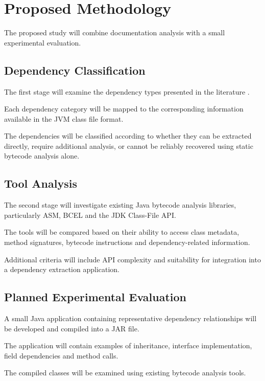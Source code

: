 \documentclass[conference]{IEEEtran}
\begin{document}
	
	\section{Proposed Methodology}
	
	The proposed study will combine
	documentation analysis with a small
	experimental evaluation.
	
	\subsection{Dependency Classification}
	
	The first stage will examine the
	dependency types presented in
	the literature \cite{b1}.
	
	Each dependency category will be
	mapped to the corresponding information
	available in the JVM class file format.
	
	The dependencies will be classified
	according to whether they can be
	extracted directly, require additional
	analysis, or cannot be reliably recovered
	using static bytecode analysis alone.
	
	\subsection{Tool Analysis}
	
	The second stage will investigate
	existing Java bytecode analysis
	libraries, particularly ASM, BCEL
	and the JDK Class-File API.
	
	The tools will be compared based on
	their ability to access class metadata,
	method signatures, bytecode instructions
	and dependency-related information.
	
	Additional criteria will include
	API complexity and suitability for
	integration into a dependency
	extraction application.
	
	\subsection{Planned Experimental Evaluation}
	
	A small Java application containing
	representative dependency relationships
	will be developed and compiled
	into a JAR file.
	
	The application will contain examples
	of inheritance, interface implementation,
	field dependencies and method calls.
	
	The compiled classes will be examined
	using existing bytecode analysis tools.
	
\end{document}
